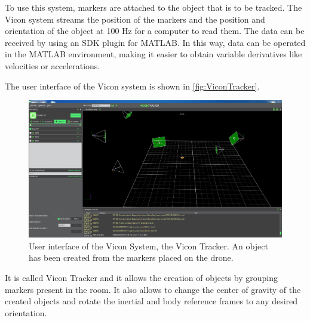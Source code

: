 To use this system, markers are attached to the object that is to be tracked. The Vicon system streams the position of the markers and the position and orientation of the object at 100 Hz for a computer to read them. The data can be received by using an SDK plugin for MATLAB. In this way, data can be operated in the MATLAB environment, making it easier to obtain variable derivatives like velocities or accelerations.

The user interface of the Vicon system is shown in \autoref{fig:ViconTracker}. 
\begin{figure}[H]
	\centering
	\includegraphics[scale=0.27]{figures/ViconTracker}
	\caption{User interface of the Vicon System, the Vicon Tracker. An object has been created from the markers placed on the drone.}
	\label{fig:ViconTracker}
\end{figure}
It is called Vicon Tracker and it allows the creation of objects by grouping markers present in the room. It also allows to change the center of gravity of the created objects and rotate the inertial and body reference frames to any desired orientation.